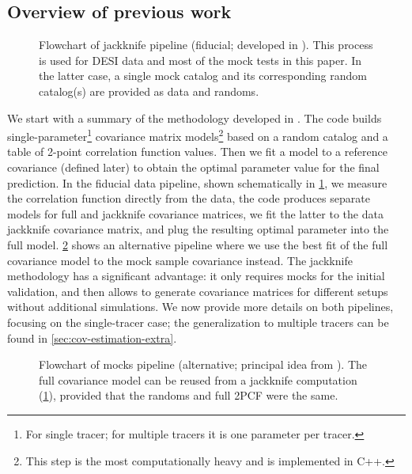 \subsection{Overview of previous work}
\label{sec:cov-estimation-review}

\begin{figure}[tb!]
    \centering
    
    \caption[\rascalc{} jackknife (fiducial) pipeline flowchart]{Flowchart of \rascalc{} jackknife pipeline (fiducial; developed in \cite{rascal-jackknife,rascalC}).
    This process is used for DESI data and most of the mock tests in this paper.
    In the latter case, a single mock catalog and its corresponding random catalog(s) are provided as data and randoms.}
    \label{fig:pipeline-jack}
\end{figure}

We start with a summary of the methodology developed in \cite{rascal,rascal-jackknife,rascalC}.
The \rascalc{} code builds single-parameter\footnote{For single tracer; for multiple tracers it is one parameter per tracer.} covariance matrix models\footnote{This step is the most computationally heavy and is implemented in C++.} based on a random catalog and a table of 2-point correlation function values.
Then we fit a model to a reference covariance (defined later) to obtain the optimal parameter value for the final prediction.
In the fiducial data pipeline, shown schematically in \cref{fig:pipeline-jack}, we measure the correlation function directly from the data, the code produces separate models for full and jackknife covariance matrices, we fit the latter to the data jackknife covariance matrix, and plug the resulting optimal parameter into the full model.
\cref{fig:pipeline-mocks} shows an alternative pipeline where we use the best fit of the full covariance model to the mock sample covariance instead.
The jackknife methodology has a significant advantage: it only requires mocks for the initial validation, and then allows to generate covariance matrices for different setups without additional simulations.
We now provide more details on both pipelines, focusing on the single-tracer case; the generalization to multiple tracers can be found in \cref{sec:cov-estimation-extra}.

\begin{figure}[tb!]
    \centering
    
    \caption[\rascalc{} mocks (alternative) pipeline flowchart]{Flowchart of \rascalc{} mocks pipeline (alternative; principal idea from \cite{rascal}).
    The full covariance model can be reused from a jackknife computation (\cref{fig:pipeline-jack}), provided that the randoms and full 2PCF were the same.}
    \label{fig:pipeline-mocks}
\end{figure}


